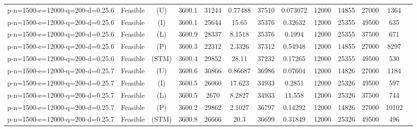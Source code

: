 \documentclass[landscape, a4paper]{article}
\newcommand{\STM}{\ensuremath{\mathrm{STM}}}
\newcommand{\Improved}{\ensuremath{\mathrm{I}}}
\newcommand{\Loose}{\ensuremath{\mathrm{L}}}
\newcommand{\Profit}{\ensuremath{\mathrm{P}}}
\newcommand{\Utility}{\ensuremath{\mathrm{U}}}
\begin{document}
\begin{center}
\begin{tabular}{lcccccccccccc}
p-n=1500-e=12000-q=200-d=0.25.6 & Feasible & (\Utility) & 3600.1 & 31244 & 0.77488 & 37510 & 0.073072 & 12000 & 14855 & 27000 & 1364 & \\
p-n=1500-e=12000-q=200-d=0.25.6 & Feasible & (\Improved) & 3600.1 & 25644 & 15.65 & 35376 & 0.32632 & 12000 & 25355 & 49500 & 635 & \\
p-n=1500-e=12000-q=200-d=0.25.6 & Feasible & (\Loose) & 3600.9 & 28337 & 8.1518 & 35376 & 0.1994 & 12000 & 25355 & 37500 & 671 & \\
p-n=1500-e=12000-q=200-d=0.25.6 & Feasible & (\Profit) & 3600.3 & 22312 & 2.3326 & 37312 & 0.54948 & 12000 & 14855 & 27000 & 8297 & \\
p-n=1500-e=12000-q=200-d=0.25.6 & Feasible & (\STM) & 3600.4 & 29852 & 28.11 & 37232 & 0.17265 & 12000 & 25355 & 49500 & 530 & \\
p-n=1500-e=12000-q=200-d=0.25.7 & Feasible & (\Utility) & 3600.6 & 30866 & 0.86687 & 36986 & 0.07604 & 12000 & 14826 & 27000 & 1184 & \\
p-n=1500-e=12000-q=200-d=0.25.7 & Feasible & (\Improved) & 3600.5 & 26060 & 17.623 & 34933 & 0.2851 & 12000 & 25326 & 49500 & 597 & \\
p-n=1500-e=12000-q=200-d=0.25.7 & Feasible & (\Loose) & 3600.5 & 2670 & 8.2827 & 34933 & 11.558 & 12000 & 25326 & 37500 & 744 & \\
p-n=1500-e=12000-q=200-d=0.25.7 & Feasible & (\Profit) & 3600.2 & 29862 & 2.1027 & 36797 & 0.14292 & 12000 & 14826 & 27000 & 10102 & \\
p-n=1500-e=12000-q=200-d=0.25.7 & Feasible & (\STM) & 3600.8 & 26666 & 20.3 & 36699 & 0.31849 & 12000 & 25326 & 49500 & 496 & \\
\end{tabular}
\end{center}
\end{document}
